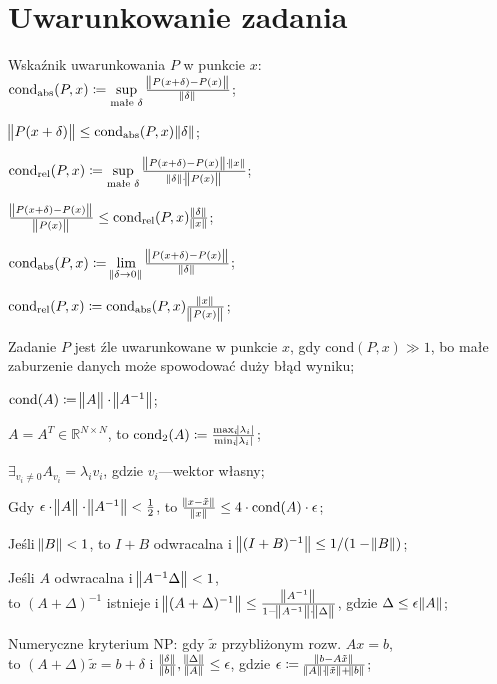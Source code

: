 \section{Uwarunkowanie zadania}

\entry
Wskaźnik uwarunkowania $P$ w punkcie $x$:\\ $\mathrm{cond}_{\mathrm{abs}}(P,x) \coloneqq \sup\limits_{\text{małe }\delta} \frac{\norm{P(x+\delta) - P(x)}}{\norm{\delta}}$;

\entry
$\norm{P(x+\delta)} \leq \mathrm{cond}_{\mathrm{abs}}(P,x)\norm{\delta}$;

\entry
$\mathrm{cond}_{\mathrm{rel}}(P,x) \coloneqq \sup\limits_{\text{małe }\delta} \frac{\norm{P(x+\delta) - P(x)} \cdot \norm{x}}{\norm{\delta} \cdot \norm{P(x)}}$;

\entry
$\frac{\norm{P(x+\delta) - P(x)}}{\norm{P(x)}} \leq \mathrm{cond}_{\mathrm{rel}}(P,x)\frac{\norm{\delta}}{\norm{x}}$;


\entry
$\mathrm{cond}_{\mathrm{abs}}(P,x) \coloneqq \lim\limits_{\norm{\delta \to 0}} \frac{\norm{P(x+\delta) - P(x)}}{\norm{\delta}}$;

\entry
$\mathrm{cond}_{\mathrm{rel}}(P,x) \coloneqq \mathrm{cond}_{\mathrm{abs}}(P,x)\frac{\norm{x}}{\norm{P(x)}} $;

\entry
Zadanie $P$ jest źle uwarunkowane w punkcie $x$, gdy $\mathrm{cond}(P,x) \gg 1$, bo małe zaburzenie danych może spowodować duży błąd wyniku;

\entry
$\mathrm{cond}(A) \coloneqq \norm{\vphantom{A^{-1}}A}\cdot\norm{A^{-1}}$;

\entry
$A=A^T\in\mathbb{R}^{N\times N}$, to $\mathrm{cond}_2(A)\coloneqq \frac{\max_i\abs{\lambda_i}}{\min_i\abs{\lambda_i}}$;

\entry
$\exists_{v_i\neq 0} A_{v_i} = \lambda_i v_i$, gdzie $v_i$---wektor własny;

\entry
Gdy $\epsilon\cdot\norm{\vphantom{A^1}A}\cdot\norm{A^{-1}} < \frac{1}{2}$, to $\frac{\norm{x - \tilde{x}}}{\norm{x}} \leq 4 \cdot \mathrm{cond}(A) \cdot \epsilon$;

\entry
Jeśli $\norm{B} < 1$, to $I+B$ odwracalna i $\norm{(I+B)^{-1}} \leq 1 / (1 - \norm{B})$;

\entry
Jeśli $A$ odwracalna i $\norm{A^{-1}\Delta} < 1$,\\ to $(A+\Delta)^{-1}$ istnieje i $\norm{(A+\Delta)^{-1}} \leq \frac{\norm{A^{-1}}}{1 - \norm{A^{-1}} \cdot \norm{\vphantom{A^1}\Delta}}$, gdzie $\Delta \leq \epsilon\norm{A}$;


\entry
Numeryczne kryterium NP: gdy $\tilde{x}$ przybliżonym rozw. $Ax=b$,\\ to $(A+\Delta)\tilde{x}=b+\delta$ i $\frac{\norm{\delta}}{\norm{b}}, \frac{\norm{\Delta}}{\norm{A}} \leq \epsilon$, gdzie $\epsilon \coloneqq \frac{\norm{b-A\tilde{x}}}{\norm{A} \cdot \norm{\tilde{x}} + \norm{b} }$;

